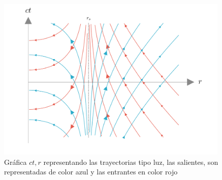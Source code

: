 \begin{figure}[H]
    \begin{small}
        \begin{center}
            \includegraphics[width=0.99\textwidth]{AgujerosNegros/Schwarzschild/media/images/rayos_Luz_Schwarzschild_ManimCE_v0.19.0.png}
        \end{center}
        \caption{Gráfica $ct,r $ representando las trayectorias tipo luz, las salientes, son representadas de color azul y las entrantes en color rojo }
        \label{fig:lightraysSchwarzschild}
    \end{small}
\end{figure}

